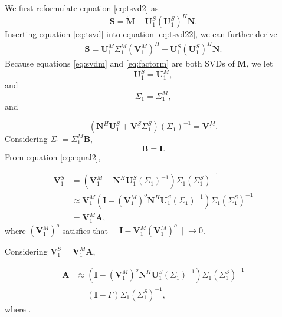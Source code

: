 \newpage
{}
We first reformulate equation \ref{eq:tsvd2} as
\begin{equation}
\label{eq:tsvd22}
\mathbf{S} = \tilde{\mathbf{M}} -\mathbf{U}_1^S(\mathbf{U}_1^S)^H\mathbf{N}.
\end{equation}
Inserting equation \ref{eq:tsvd} into equation \ref{eq:tsvd22}, we can further derive 
\begin{equation}
\label{eq:tsvd222}
\begin{split}
\mathbf{S} = \mathbf{U}_1^M\Sigma_1^M(\mathbf{V}_1^M)^H -\mathbf{U}_1^S(\mathbf{U}_1^S)^H\mathbf{N}.
\end{split}
\end{equation}
Because equations \ref{eq:svdm} and \ref{eq:factorm} are both SVDs of $\mathbf{M}$, we let
\begin{equation}
\label{eq:equal1}
\mathbf{U}_1^S=\mathbf{U}_1^M,
\end{equation}
and
\begin{equation}
\label{eq:equal3}
\Sigma_1=\Sigma_1^M,
\end{equation}
and

\begin{equation}
\label{eq:equal2}
(\mathbf{N}^H\mathbf{U}_1^S+\mathbf{V}_1^S\Sigma_1^S)(\Sigma_1)^{-1}=\mathbf{V}_1^M.
\end{equation}
Considering $\Sigma_1= \Sigma_1^M\mathbf{B}$,
\begin{equation}
\label{eq:Bder}
\mathbf{B}=\mathbf{I}.
\end{equation}
From equation \ref{eq:equal2},

\begin{equation}
\label{eq:Ader0}
\begin{split}
\mathbf{V}_1^S&=(\mathbf{V}_1^M-\mathbf{N}^H\mathbf{U}_1^S(\Sigma_1)^{-1})\Sigma_1(\Sigma_1^S)^{-1}\\
&\approx \mathbf{V}_1^M(\mathbf{I}-(\mathbf{V}_1^M)^{o}\mathbf{N}^H\mathbf{U}_1^S(\Sigma_1)^{-1})\Sigma_1(\Sigma_1^S)^{-1}\\
&=\mathbf{V}_1^M\mathbf{A},
\end{split}
\end{equation}
where $(\mathbf{V}_1^M)^{o}$ satisfies that $\parallel\mathbf{I}-\mathbf{V}_1^M(\mathbf{V}_1^M)^{o} \parallel\rightarrow 0$.

Considering $\mathbf{V}_1^S=\mathbf{V}_1^M\mathbf{A}$,

\begin{equation}
\label{eq:Ader}
\begin{split}
\mathbf{A}&\approx (\mathbf{I}-(\mathbf{V}_1^M)^{o}\mathbf{N}^H\mathbf{U}_1^S(\Sigma_1)^{-1})\Sigma_1(\Sigma_1^S)^{-1}\\
&=(\mathbf{I}-\Gamma)\Sigma_1(\Sigma_1^S)^{-1},
\end{split}
\end{equation}
where .

